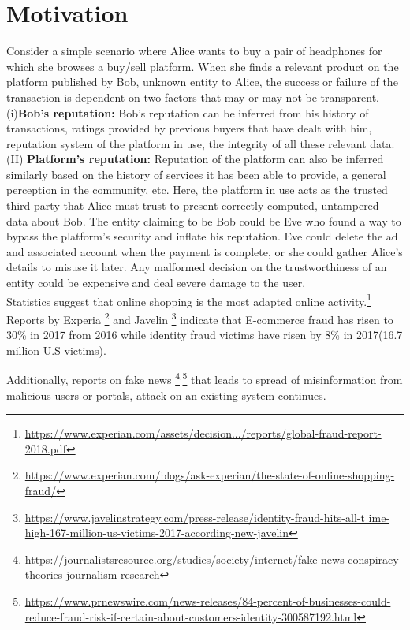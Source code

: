 \section{Motivation}
Consider a simple scenario where Alice wants to buy a pair of headphones for
which she browses a buy/sell platform. When she finds a relevant product on the
platform published by Bob, unknown entity to Alice, the success or failure of
the transaction is dependent on two factors that may or may not be transparent.\\
(i)\textbf{Bob's reputation:} Bob's reputation can be inferred from his history of
transactions, ratings provided by previous buyers that have dealt with him,
reputation system of the platform in use, the integrity of all these relevant
data. \\
(II) \textbf{Platform's reputation:} Reputation of the platform can also be inferred
similarly based on the history of services it has been able to provide, a
general perception in the community, etc. 
Here, the platform in use acts as the trusted third party that Alice must trust
to present correctly computed, untampered data about Bob. The entity claiming
to be Bob could be Eve who found a way to bypass the platform's security and
inflate his reputation. Eve could delete the ad and associated account when the
payment is complete, or she could gather Alice's details to misuse it later.
Any malformed decision on the trustworthiness of an entity could be expensive
and deal severe damage to the user.\\ 
Statistics suggest that online shopping is the most adapted online
activity.\footnote{\url{https://www.experian.com/assets/decision.../reports/global-fraud-report-2018.pdf}}
Reports by Experia
\footnote{\url{https://www.experian.com/blogs/ask-experian/the-state-of-online-shopping-fraud/}}
and Javelin
\footnote{\url{https://www.javelinstrategy.com/press-release/identity-fraud-hits-all-t
ime-high-167-million-us-victims-2017-according-new-javelin}} indicate that
E-commerce fraud has risen to 30\% in 2017 from 2016 while identity fraud
victims have risen by 8\% in 2017(16.7 million U.S victims). 

Additionally, reports on fake news
\footnote{\url{https://journalistsresource.org/studies/society/internet/fake-news-conspiracy-theories-journalism-research}}$^{,}$\footnote{\url{https://www.prnewswire.com/news-releases/84-percent-of-businesses-could-reduce-fraud-risk-if-certain-about-customers-identity-300587192.html}}
that leads to spread of misinformation from malicious users or portals, attack
on an existing system continues.


